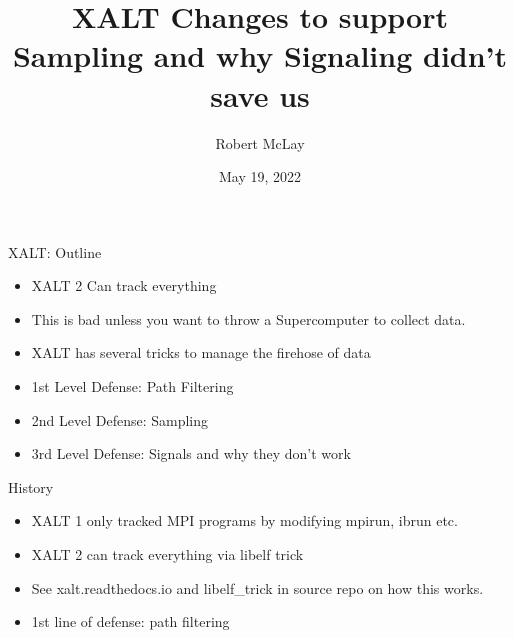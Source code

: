 \documentclass{beamer}
\begin{document}
\title[XALT]{XALT Changes to support Sampling and why Signaling didn't
save us}
\author{Robert McLay}
\date{May 19, 2022}

\frame{\titlepage}

\begin{frame}{XALT: Outline}
  \begin{itemize}
    \item XALT 2 Can track everything 
    \item This is bad unless you want to throw a Supercomputer to
      collect data.
    \item XALT has several tricks to manage the firehose of data
    \item 1st Level Defense: Path Filtering
    \item 2nd Level Defense: Sampling
    \item 3rd Level Defense: Signals and why they don't work
  \end{itemize}
\end{frame}

\begin{frame}{History}
  \begin{itemize}
    \item XALT 1 only tracked MPI programs by modifying mpirun, ibrun etc.
    \item XALT 2 can track everything via libelf trick
    \item See xalt.readthedocs.io and libelf\_trick in source repo on
      how this works.
    \item 1st line of defense: path filtering
  \end{itemize}
\end{frame}
\end{document}
